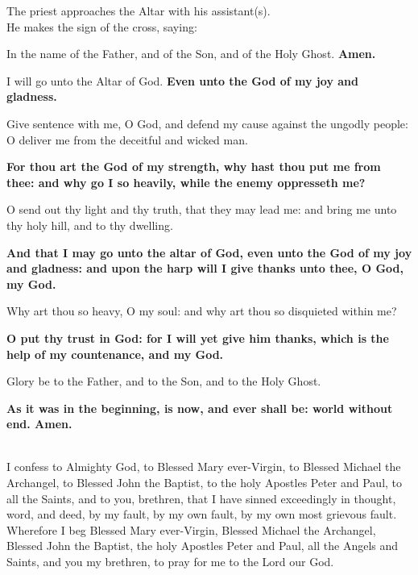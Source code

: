 
\begin{rubric}
The priest approaches the Altar with his assistant(s).\\
He makes the sign of the cross, saying:
\end{rubric}

\cross In the name of the Father, and of the Son, and of the Holy Ghost. \textbf{Amen.}

I will go unto the Altar of God.
\textbf{Even unto the God of my joy and gladness.}

Give sentence with me, O God, and defend my cause against the ungodly
people: O deliver me from the deceitful and wicked man.

\textbf{For thou art the God of my strength, why hast thou put me from thee:
and why go I so heavily, while the enemy oppresseth me?}

O send out thy light and thy truth, that they may lead me: and bring me unto thy holy hill, and to thy dwelling.

\textbf{And that I may go unto the altar of God, even unto the God of my joy
and gladness: and upon the harp will I give thanks unto thee, O God, my God.}

Why art thou so heavy, O my soul: and why art thou so disquieted within me?

\textbf{O put thy trust in God: for I will yet give him thanks, which is the help
of my countenance, and my God.}

Glory be to the Father, and to the Son, and to the Holy Ghost.

\textbf{As it was in the beginning, is now, and ever shall be: world without end. Amen.}


\\
I confess to Almighty God, to Blessed Mary ever-Virgin, to Blessed Michael
the Archangel, to Blessed John the Baptist, to the holy Apostles Peter and
Paul, to all the Saints, and to you, brethren, that I have sinned exceedingly in
thought, word, and deed, by my fault, by my own fault, by my own most
grievous fault. Wherefore I beg Blessed Mary ever-Virgin, Blessed Michael
the Archangel, Blessed John the Baptist, the holy Apostles Peter and Paul, all
the Angels and Saints, and you my brethren, to pray for me to the Lord our
God.

